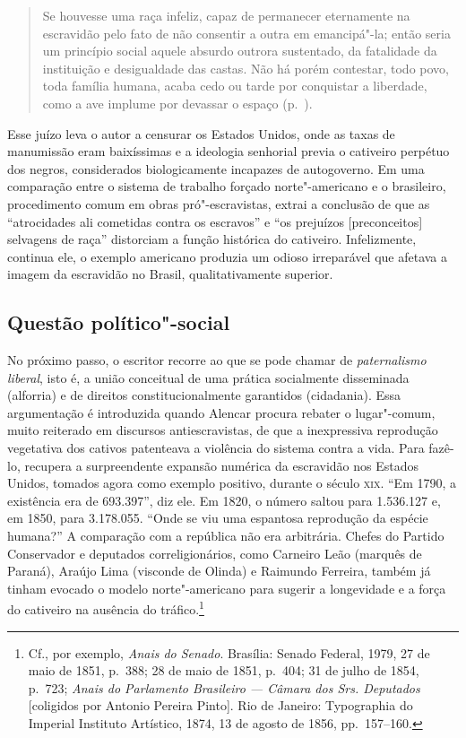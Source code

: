\begin{quote}
Se houvesse uma raça infeliz, capaz de permanecer eternamente na
escravidão pelo fato de não consentir a outra em emancipá"-la; então
seria um princípio social aquele absurdo outrora sustentado, da
fatalidade da instituição e desigualdade das castas. Não há porém
contestar, todo povo, toda família humana, acaba cedo ou tarde por
conquistar a liberdade, como a ave implume por devassar o espaço 
(p.~\pageref{implume}). 
\end{quote}

Esse juízo leva o autor a censurar os Estados Unidos, onde as taxas de
manumissão eram baixíssimas e a ideologia senhorial previa o cativeiro
perpétuo dos negros, considerados biologicamente incapazes de
autogoverno. Em uma comparação entre o sistema de trabalho forçado
norte"-americano e o brasileiro, procedimento comum em obras
pró"-escravistas, extrai a conclusão de que as ``atrocidades ali
cometidas contra os escravos'' e ``os prejuízos [preconceitos] selvagens
de raça'' distorciam a função histórica do cativeiro. Infelizmente,
continua ele, o exemplo americano produzia um odioso irreparável que
afetava a imagem da escravidão no Brasil, qualitativamente superior.  

\subsection{Questão político"-social}

No próximo passo, o escritor recorre
ao que se pode chamar de \textit{paternalismo liberal}, isto é, a união conceitual
de uma prática socialmente disseminada (alforria) e de direitos 
constitucionalmente garantidos (cidadania). Essa argumentação é 
introduzida quando Alencar procura rebater o lugar"-comum, muito reiterado 
em discursos antiescravistas, de que a inexpressiva reprodução vegetativa 
dos cativos patenteava a violência do sistema contra a vida. Para fazê-lo, 
recupera a surpreendente expansão numérica da escravidão nos Estados Unidos,
tomados agora como exemplo positivo, durante o século \textsc{xix}. “Em 1790, 
a existência era de 693.397”, diz ele. Em 1820, o número saltou para 1.536.127 
e, em 1850, para 3.178.055. “Onde se viu uma espantosa reprodução da espécie 
humana?” A comparação com a república não era arbitrária. Chefes do Partido 
Conservador e deputados correligionários, como Carneiro Leão (marquês de Paraná), 
Araújo Lima (visconde de Olinda) e Raimundo Ferreira, também já tinham 
evocado o modelo norte"-americano para sugerir a longevidade e a força do 
cativeiro na ausência do tráfico.\footnote{ Cf., por exemplo,
\textit{Anais do Senado}. Brasília: Senado Federal, 1979, 
27 de maio de 1851, p.~388; 28 de maio de 1851, p.~404; 31 de julho de 1854, 
p.~723; \textit{Anais do Parlamento Brasileiro --- Câmara dos Srs. Deputados} [coligidos por
Antonio Pereira Pinto]. Rio de Janeiro: Typographia do Imperial
Instituto Artístico, 1874, 13 de agosto de 1856, pp.~157--160.} 

